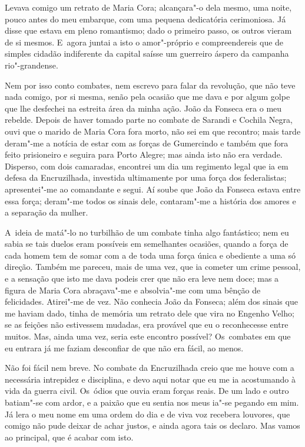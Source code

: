 Levava comigo um retrato de Maria Cora; alcançara"-o dela mesmo, uma
noite, pouco antes do meu embarque, com uma pequena dedicatória
cerimoniosa. Já disse que estava em pleno romantismo; dado o primeiro
passo, os outros vieram de si mesmos. E~agora juntai a isto o
amor"-próprio e compreendereis que de simples cidadão indiferente da
capital saísse um guerreiro áspero da campanha rio"-grandense.

Nem por isso conto combates, nem escrevo para falar da revolução, que
não teve nada comigo, por si mesma, senão pela ocasião que me dava e por
algum golpe que lhe desfechei na estreita área da minha ação. João da
Fonseca era o meu rebelde. Depois de haver tomado parte no combate de
Sarandi e Cochila Negra, ouvi que o marido de Maria Cora fora morto, não
sei em que recontro; mais tarde deram"-me a notícia de estar com as
forças de Gumercindo e também que fora feito prisioneiro e seguira para
Porto Alegre; mas ainda isto não era verdade. Disperso, com dois
camaradas, encontrei um dia um regimento legal que ia em defesa da
Encruzilhada, investida ultimamente por uma força dos federalistas;
apresentei"-me ao comandante e segui. Aí soube que João da Fonseca estava
entre essa força; deram"-me todos os sinais dele, contaram"-me a história
dos amores e a separação da mulher.

A~ideia de matá"-lo no turbilhão de um combate tinha algo fantástico; nem
eu sabia se tais duelos eram possíveis em semelhantes ocasiões, quando a
força de cada homem tem de somar com a de toda uma força única e
obediente a uma só direção. Também me pareceu, mais de uma vez, que ia
cometer um crime pessoal, e a sensação que isto me dava podeis crer que
não era leve nem doce; mas a figura de Maria Cora abraçava"-me e
absolvia"-me com uma bênção de felicidades. Atirei"-me de vez. Não
conhecia João da Fonseca; além dos sinais que me haviam dado, tinha de
memória um retrato dele que vira no Engenho Velho; se as feições não
estivessem mudadas, era provável que eu o reconhecesse entre muitos.
Mas, ainda uma vez, seria este encontro possível? Os~combates em que eu
entrara já me faziam desconfiar de que não era fácil, ao menos.

Não foi fácil nem breve. No combate da Encruzilhada creio que me houve
com a necessária intrepidez e disciplina, e devo aqui notar que eu me ia
acostumando à vida da guerra civil. Os~ódios que ouvia eram forças
reais. De um lado e outro batiam"-se com ardor, e a paixão que eu sentia
nos meus ia"-se pegando em mim. Já lera o meu nome em uma ordem do dia e
de viva voz recebera louvores, que comigo não pude deixar de achar
justos, e ainda agora tais os declaro. Mas vamos ao principal, que é
acabar com isto.

